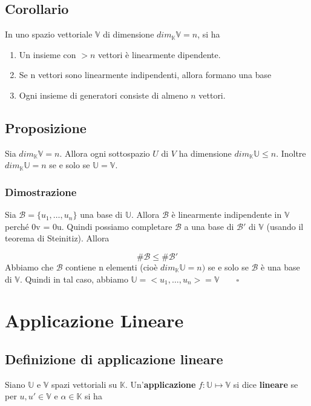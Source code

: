 \documentclass[12pt]{article}
\begin{document}
\subsection{Corollario}

In uno spazio vettoriale $\mathbb{V}$ di dimensione $dim_{\mathbb{K}}\mathbb{V} = n$, si ha
\begin{enumerate}
    \item Un insieme con $> n$ vettori è linearmente dipendente.
    \item Se n vettori sono linearmente indipendenti, allora formano una base
    \item Ogni insieme di generatori consiste di almeno $n$ vettori.
\end{enumerate}

\subsection{Proposizione}

Sia $dim_{\mathbb{K}}\mathbb{V} = n$. Allora ogni sottospazio $U$ di $V$ ha dimensione $dim_{\mathbb{K}}\mathbb{U} \le n$. Inoltre $dim_{\mathbb{K}}\mathbb{U} = n$ se e solo se $\mathbb{U} = \mathbb{V}$.

\subsubsection{Dimostrazione}

Sia $\mathcal{B} = \{u_1, \dots, u_n\}$ una base di $\mathbb{U}$. Allora $\mathcal{B}$ è linearmente indipendente in $\mathbb{V}$ perché 0v = 0u. Quindi possiamo completare $\mathcal{B}$ a una base di $\mathcal{B}'$ di $\mathbb{V}$ (usando il teorema di Steinitiz). Allora

\[\#\mathcal{B} \le \#\mathcal{B}'\]
Abbiamo che $\mathcal{B}$ contiene n elementi (cioè $dim_{\mathbb{K}}\mathbb{U} = n)$ se e solo se $\mathcal{B}$ è una base di $\mathbb{V}$. Quindi in tal caso, abbiamo $\mathbb{U} = <u_1, \dots, u_n> = \mathbb{V} \quad \quad \square$
\pagebreak
\section{Applicazione Lineare}

\subsection{Definizione di applicazione lineare}

Siano $\mathbb{U}$ e $\mathbb{V}$ spazi vettoriali su $\mathbb{K}$. Un'\textbf{applicazione} $f: \mathbb{U} \mapsto \mathbb{V}$ si dice \textbf{lineare} se per $u, u' \in \mathbb{V}$ e $\alpha \in \mathbb{K}$ si ha
\end{document}
